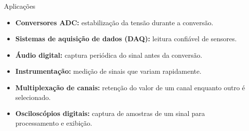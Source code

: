 \begin{frame}{Aplicações}
  \begin{itemize}
    \item \textbf{Conversores ADC:} estabilização da tensão durante a conversão.
    \item \textbf{Sistemas de aquisição de dados (DAQ):} leitura confiável de sensores.
    \item \textbf{Áudio digital:} captura periódica do sinal antes da conversão.
    \item \textbf{Instrumentação:} medição de sinais que variam rapidamente.
    \item \textbf{Multiplexação de canais:} retenção do valor de um canal enquanto outro é selecionado.
    \item \textbf{Osciloscópios digitais:} captura de amostras de um sinal para processamento e exibição.
  \end{itemize}
\end{frame}